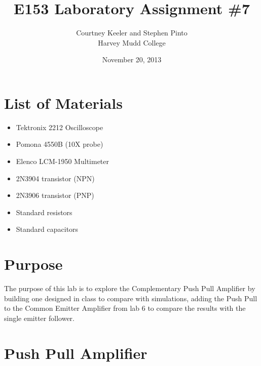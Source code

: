 \documentclass[12pt,letterpaper]{report}
\begin{document}
\title{E153 Laboratory Assignment \#7}
\author{Courtney Keeler and Stephen Pinto\\
Harvey Mudd College}
\date{November 20, 2013}
\maketitle

\section*{List of Materials}
\begin{itemize}
	\item Tektronix 2212 Oscilloscope
	\item Pomona 4550B (10X probe)
	\item Elenco LCM-1950 Multimeter
	\item 2N3904 transistor (NPN)
	\item 2N3906 transistor (PNP)
	\item Standard resistors
	\item Standard capacitors
\end{itemize}

\section*{Purpose}
The purpose of this lab is to explore the Complementary Push Pull Amplifier by building one designed in class to compare with simulations, adding the Push Pull to the Common Emitter Amplifier from lab 6 to compare the results with the single emitter follower.

\section*{Push Pull Amplifier}
\end{document}

